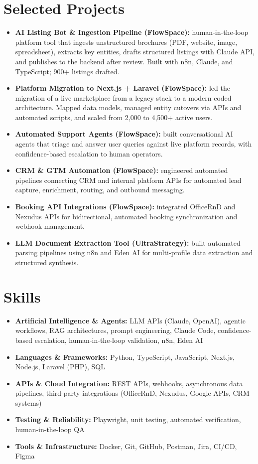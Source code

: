 \documentclass[a4paper,10pt]{article}
\begin{document}
\section{Selected Projects}
\begin{itemize}
 \item \textbf{AI Listing Bot \& Ingestion Pipeline (FlowSpace):} human-in-the-loop platform tool that ingests unstructured brochures (PDF, website, image, spreadsheet), extracts key entities, drafts structured listings with Claude API, and publishes to the backend after review. Built with n8n, Claude, and TypeScript; 900+ listings drafted.
 \item \textbf{Platform Migration to Next.js + Laravel (FlowSpace):} led the migration of a live marketplace from a legacy stack to a modern coded architecture. Mapped data models, managed entity cutovers via APIs and automated scripts, and scaled from 2,000 to 4,500+ active users.
 \item \textbf{Automated Support Agents (FlowSpace):} built conversational AI agents that triage and answer user queries against live platform records, with confidence-based escalation to human operators.
 \item \textbf{CRM \& GTM Automation (FlowSpace):} engineered automated pipelines connecting CRM and internal platform APIs for automated lead capture, enrichment, routing, and outbound messaging.
 \item \textbf{Booking API Integrations (FlowSpace):} integrated OfficeRnD and Nexudus APIs for bidirectional, automated booking synchronization and webhook management.
 \item \textbf{LLM Document Extraction Tool (UltraStrategy):} built automated parsing pipelines using n8n and Eden AI for multi-profile data extraction and structured synthesis.
\end{itemize}

\section{Skills}
\begin{itemize}
 \item \textbf{Artificial Intelligence \& Agents:} LLM APIs (Claude, OpenAI), agentic workflows, RAG architectures, prompt engineering, Claude Code, confidence-based escalation, human-in-the-loop validation, n8n, Eden AI
 \item \textbf{Languages \& Frameworks:} Python, TypeScript, JavaScript, Next.js, Node.js, Laravel (PHP), SQL
 \item \textbf{APIs \& Cloud Integration:} REST APIs, webhooks, asynchronous data pipelines, third-party integrations (OfficeRnD, Nexudus, Google APIs, CRM systems)
 \item \textbf{Testing \& Reliability:} Playwright, unit testing, automated verification, human-in-the-loop QA
 \item \textbf{Tools \& Infrastructure:} Docker, Git, GitHub, Postman, Jira, CI/CD, Figma
\end{itemize}
\end{document}
